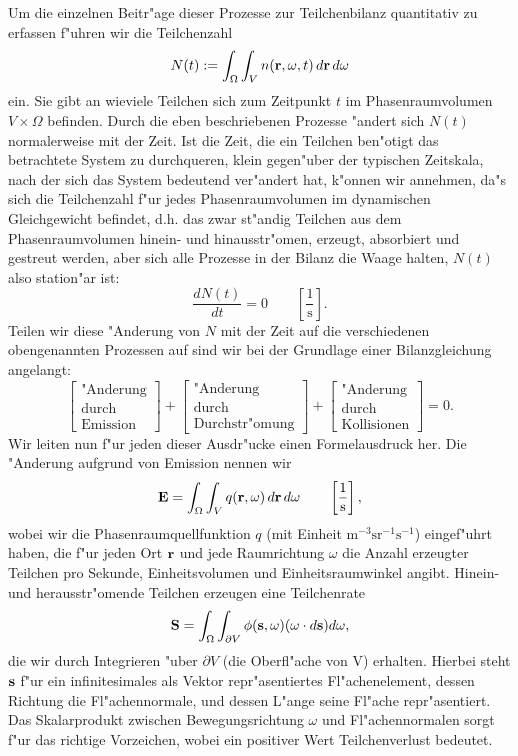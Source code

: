 	Um die einzelnen Beitr"age dieser Prozesse zur Teilchenbilanz quantitativ zu erfassen f"uhren wir die Teilchenzahl $$N(t):=\int_\Omega \int_V n(\mathbf{r},\omega,t)\,d\mathbf{r}\,d\omega$$ ein. Sie gibt an wieviele Teilchen sich zum Zeitpunkt $t$ im Phasenraumvolumen $V \times \Omega$ befinden. Durch die eben beschriebenen Prozesse "andert sich $N(t)$ normalerweise mit der Zeit. Ist die Zeit, die ein Teilchen ben"otigt das betrachtete System zu durchqueren, klein gegen"uber der typischen Zeitskala, nach der sich das System bedeutend ver"andert hat, k"onnen wir annehmen, da"s sich die Teilchenzahl f"ur jedes Phasenraumvolumen im dynamischen Gleichgewicht befindet, d.h. das zwar st"andig Teilchen aus dem Phasenraumvolumen hinein- und hinausstr"omen, erzeugt, absorbiert und gestreut werden, aber sich alle Prozesse in der Bilanz die Waage halten, $N(t)$ also station"ar ist:$$\frac{dN(t)}{dt}=0\qquad\left[\frac{1}{\text{s}}\right].$$ Teilen wir diese "Anderung von $N$ mit der Zeit auf die verschiedenen obengenannten Prozessen auf sind wir bei der Grundlage einer Bilanzgleichung angelangt:$$\begin{bmatrix}\text{"Anderung}\\ \text{durch}\\ \text{Emission}\end{bmatrix}+\begin{bmatrix}\text{"Anderung}\\ \text{durch}\\ \text{Durchstr"omung}\end{bmatrix}+\begin{bmatrix}\text{"Anderung}\\ \text{durch}\\ \text{Kollisionen}\end{bmatrix}=0.$$ Wir leiten nun f"ur jeden dieser Ausdr"ucke einen Formelausdruck her.
	Die "Anderung aufgrund von Emission nennen wir $$\mathbf{E}=\int_\Omega \int_V q(\mathbf{r},\omega)\,d\mathbf{r}\,d\omega\qquad\left[\frac{1}{\text{s}}\right],$$ wobei wir die Phasenraumquellfunktion $q$ (mit Einheit $\text{m}^{-3}\text{sr}^{-1}\text{s}^{-1}$) eingef"uhrt haben, die f"ur jeden Ort $\mathbf{r}$ und jede Raumrichtung $\omega$ die Anzahl erzeugter Teilchen pro Sekunde, Einheitsvolumen und Einheitsraumwinkel angibt. Hinein- und herausstr"omende Teilchen erzeugen eine Teilchenrate
	$$\mathbf{S}=\int_\Omega \int_{\partial V} \phi(\mathbf{s},\omega)(\omega \cdot d\mathbf{s})d\omega,$$
	die wir durch Integrieren "uber $\partial V$ (die Oberfl"ache von V) erhalten. Hierbei steht $\mathbf{s}$ f"ur ein infinitesimales als Vektor repr"asentiertes Fl"achenelement, dessen Richtung die Fl"achennormale, und dessen L"ange seine Fl"ache repr"asentiert. Das Skalarprodukt zwischen Bewegungsrichtung $\omega$ und Fl"achennormalen sorgt f"ur das richtige Vorzeichen, wobei ein positiver Wert Teilchenverlust bedeutet.
